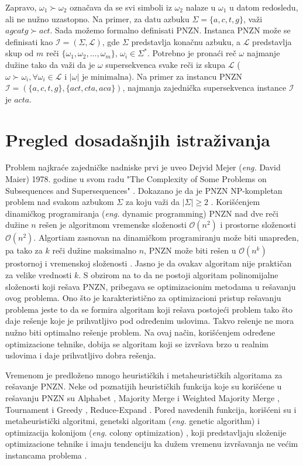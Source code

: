 \documentclass[12pt,oneside]{memoir}
\begin{document}
Zapravo, $\omega_{1}\succ\omega_{2}$ označava da se svi simboli iz $\omega_{2}$ nalaze u $\omega_{1}$ u datom redosledu,
ali ne nužno uzastopno. Na primer, za datu azbuku $\Sigma=\{a,c,t,g\}$, važi $agcatg \succ act$.
Sada možemo formalno definisati PNZN. Instanca PNZN može se definisati kao $\mathcal{I} =(\Sigma,\mathcal{L})$, gde 
$\Sigma$  predstavlja konačnu azbuku, a $\mathcal{L}$ predstavlja skup od $m$ reči $\{\omega_{1},\omega_{2},...,\omega_{m}\}$,
$\omega_{i}\in\Sigma^*$. Potrebno je pronaći reč $\omega$ najmanje dužine tako da važi da je $\omega$ supersekvenca svake reči iz
skupa $\mathcal{L}$ ($\omega\succ\omega_{i}, \forall\omega_{i}\in\mathcal{L} \textrm{ i } |\omega| \textrm{ je minimalna}$).
Na primer za instancu PNZN $\mathcal{I}=(\{a,c,t,g\},\{act,cta,aca\})$, najmanja zajednička supersekvenca
instance $\mathcal{I}$ je $acta$.  

\section{Pregled dosadašnjih istraživanja}
Problem najkraće zajedničke nadniske prvi je uveo Dejvid Mejer (\textit{eng.} David Maier) 1978. godine u svom radu 
"The Complexity of Some Problems on Subsequences and Supersequences" \cite{Maier}. Dokazano je da je PNZN NP-kompletan 
problem nad svakom azbukom $\Sigma$ za koju važi da $|\Sigma|\geqslant2$ \cite{NPComplete}. Korišćenjem dinamičkog
programiranja (\textit{eng.} dynamic programming) PNZN nad dve reči dužine $n$ rešen je algoritmom vremenske 
složenosti $\mathcal{O}(n^{2})$ i prostorne složenosti $\mathcal{O}(n^{2})$. Algortiam zasnovan na dinamičkom programiranju
može biti unapređen, pa tako za $k$ reči dužine maksimalno $n$, PNZN može biti rešen u $\mathcal{O}(n^{k})$ prostornoj i 
vremenskoj složenosti \cite{SCSDinamicProg}. Jasno je da ovakav algoritam nije praktičan za velike vrednosti $k$. S obzirom na to da ne postoji 
algoritam polinomijalne složenosti koji rešava PNZN, pribegava se optimizacionim metodama u rešavanju ovog problema.
Ono što je karakteristično za optimizacioni pristup rešavanju problema jeste to da se formira algoritam koji rešava
postojeći problem tako što daje rešenje koje je prihvatljivo pod određenim uslovima. Takvo rešenje ne mora nužno biti
optimalno rešenje problem. Na ovaj način, korišćenjem određene optimizacione tehnike, dobija se algoritam koji se izvršava
brzo u realnim uslovima i daje prihvatljivo dobra rešenja.

Vremenom je predloženo mnogo heurističkih i metaheurističkih algoritama za rešavanje PNZN.
Neke od poznatijih heurističkih funkcija koje su korišćene u rešavanju PNZN su Alphabet \cite{AlphabetSCS}, Majority Merge 
i Weighted Majority Merge \cite{ProbabilisticBS}, Tournament i Greedy \cite{Tournament}, Reduce-Expand \cite{AlphabetSCS}.
Pored navedenih funkcija, korišćeni su i metaheuristički algoritmi, genetski algoritam (\textit{eng.} genetic algorithm) \cite{SCSGenetic} i 
optimizacija kolonijom (\textit{eng.} colony optimization) \cite{SCSColony}, koji predstavljaju složenije optimizacione tehnike i imaju
tendenciju ka dužem vremenu izvršavanja ne većim instancama problema \cite{SCSSBetterSolution}.
\end{document}
